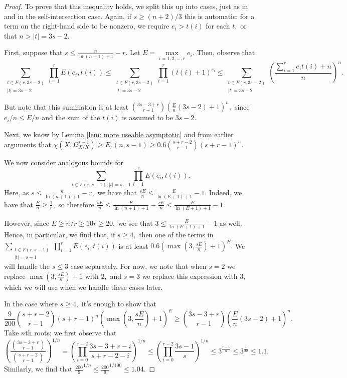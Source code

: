 \documentclass{article}
\theoremstyle{definition}
\theoremstyle{remark}
\begin{document}
\begin{proof}
\par To prove that this inequality holds, we split this up into cases, just as in \cite[Lemma C.4]{ls25} and in the self-intersection case. Again, if $s \geq (n+2)/3$ this is automatic: for a term on the right-hand side to be nonzero, we require $e_i > t(i)$ for each $t,$ or that $n > |t| = 3s - 2.$
\par First, suppose that $s \leq \frac{n}{\ln (n+1) + 1} - r.$ Let $E = \max\limits_{i=1, 2, \ldots, r} e_i.$ Then, observe that \[\sum\limits_{\substack{t \in F(r, 3s - 2) \\ |t| = 3s - 2}} \prod\limits_{i=1}^r E(e_i, t(i)) \leq \sum\limits_{\substack{t \in F(r, 3s - 2) \\ |t| = 3s - 2}} \prod\limits_{i=1}^r (t(i) + 1)^{e_i} \leq \sum\limits_{\substack{t \in F(r, 3s - 2) \\ |t| = 3s - 2}} \left(\frac{\sum\limits_{i=1}^r e_it(i) + n}{n}\right)^{n}.\]
\par But note that this summation is at least $\binom{3s - 3 + r}{r-1}\left(\frac{E}{n}(3s-2) + 1\right)^n,$ since $e_i/n \leq E/n$ and the sum of the $t(i)$ is assumed to be $3s - 2.$ 
\par Next, we know by Lemma \ref{lem: more useable asymptotic} and from earlier arguments that $\chi(X, \Omega^{s-1}_{X/K}) \geq E_r(n, s-1) \geq 0.6 \binom{s + r - 2}{r-1}(s + r - 1)^n.$
\par We now consider analogous bounds for $$\sum\limits_{t \in F(r, s-1), |t| = s-1} \prod\limits_{i=1}^r E(e_i, t(i)).$$ Here, as $s \leq \frac{n}{\ln (n+1) + 1} - r,$ we have that $\frac{sE}{n} \leq \frac{E}{\ln (E+1) + 1} - 1.$ Indeed, we have that $\frac{E}{n} \geq \frac{1}{r},$ so therefore $\frac{sE}{n} \leq \frac{E}{\ln (n+1) + 1} - \frac{rE}{n} \leq \frac{E}{\ln (E+1) + 1} - 1.$
\par However, since $E \geq n/r \geq 10r \geq 20,$ we see that $3 \leq \frac{E}{\ln (E+1) + 1} - 1$ as well. Hence, in particular, we find that, if $s \geq 4,$ then one of the terms in $\sum\limits_{\substack{t \in F(r, s - 1) \\ |t| = s - 1}} \prod\limits_{i=1}^r E(e_i, t(i))$ is at least $0.6(\max(3, \frac{sE}{n}) + 1)^E.$ We will handle the $s \leq 3$ case separately. For now, we note that when $s = 2$ we replace $\max(3, \frac{sE}{n}) + 1$ with $2,$ and $s = 3$ we replace this expression with $3,$ which we will use when we handle these cases later.
\par In the case where $s \geq 4,$ it's enough to show that \[\frac{9}{200} \binom{s + r - 2}{r-1}(s+r-1)^n (\max(3, \frac{sE}{n}) + 1)^E \geq \binom{3s - 3 + r}{r-1} (\frac{E}{n}(3s - 2) + 1)^n.\] Take $n$th roots; we first observe that $$\left(\frac{\binom{3s - 3 + r}{r-1}}{\binom{s + r - 2}{r-1}}\right)^{1/n} = \left(\prod\limits_{i=0}^{r-2} \frac{3s - 3 + r - i}{s + r - 2 - i}\right)^{1/n} \leq \left(\prod\limits_{i=0}^{r-2} \frac{3s - 1}{s}\right)^{1/n} \leq 3^{\frac{r-1}{n}} \leq 3^{\frac{1}{20}} \leq 1.1.$$ Similarly, we find that $\frac{200}{9}^{1/n} \leq \frac{200}{9}^{1/100} \leq 1.04.$

\end{proof}
\end{document}
